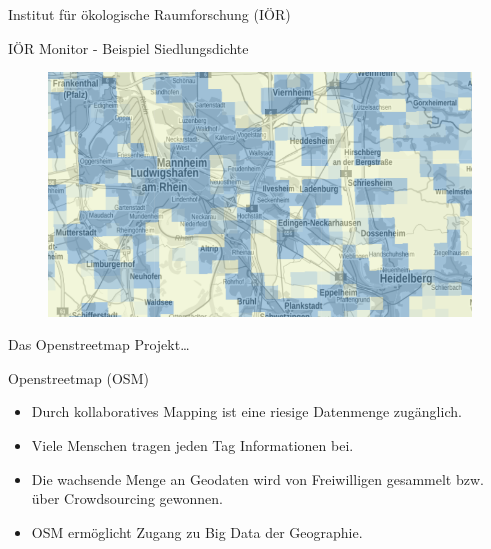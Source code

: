 \documentclass[ignorenonframetext,]{beamer}
\providecommand{\tightlist}{%
  \setlength{\itemsep}{0pt}\setlength{\parskip}{0pt}}
\begin{document}
\begin{frame}{Institut für ökologische Raumforschung (IÖR)}

\begin{block}{IÖR Monitor - Beispiel Siedlungsdichte}

\begin{figure}
\centering
\includegraphics{figure/Siedlungsdichte_ioer.PNG}
\caption{}
\end{figure}

\end{block}

\end{frame}

\begin{frame}{Das Openstreetmap Projekt\ldots{}}

\begin{block}{Openstreetmap (OSM)}

\begin{itemize}
\tightlist
\item
  Durch kollaboratives Mapping ist eine riesige Datenmenge zugänglich.
\item
  Viele Menschen tragen jeden Tag Informationen bei.
\item
  Die wachsende Menge an Geodaten wird von Freiwilligen gesammelt bzw.
  über Crowdsourcing gewonnen.
\item
  OSM ermöglicht Zugang zu Big Data der Geographie.
\end{itemize}

\end{block}

\end{frame}
\end{document}
